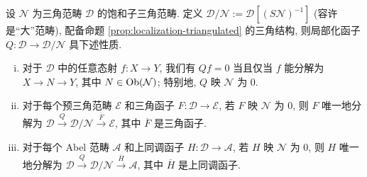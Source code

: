 \begin{theorem}\label{prop:Verdier-localization}
	设 $\mathcal{N}$ 为三角范畴 $\mathcal{D}$ 的饱和子三角范畴. 定义 $\mathcal{D}/\mathcal{N} := \mathcal{D}\left[ (S\mathcal{N})^{-1}\right]$ (容许是``大''范畴), 配备命题 \ref{prop:localization-triangulated} 的三角结构, 则局部化函子 $Q: \mathcal{D} \to \mathcal{D}/\mathcal{N}$ 具下述性质.
	\begin{enumerate}[(i)]
		\item 对于 $\mathcal{D}$ 中的任意态射 $f: X \to Y$, 我们有 $Qf = 0$ 当且仅当 $f$ 能分解为 $X \to N \to Y$, 其中 $N \in \operatorname{Ob}(\mathcal{N})$; 特别地, $Q$ 映 $\mathcal{N}$ 为 $0$.
		\item 对于每个预三角范畴 $\mathcal{E}$ 和三角函子 $F: \mathcal{D} \to \mathcal{E}$, 若 $F$ 映 $\mathcal{N}$ 为 $0$, 则 $F$ 唯一地分解为 $\mathcal{D} \xrightarrow{Q} \mathcal{D}/\mathcal{N} \xrightarrow{\overline{F}} \mathcal{E}$, 其中 $\overline{F}$ 是三角函子.
		\item 对于每个 Abel 范畴 $\mathcal{A}$ 和上同调函子 $H: \mathcal{D} \to \mathcal{A}$, 若 $H$ 映 $\mathcal{N}$ 为 $0$, 则 $H$ 唯一地分解为 $\mathcal{D} \xrightarrow{Q} \mathcal{D}/\mathcal{N} \xrightarrow{\overline{H}} \mathcal{A}$, 其中 $\overline{H}$ 是上同调函子.
	\end{enumerate}
\end{theorem}

